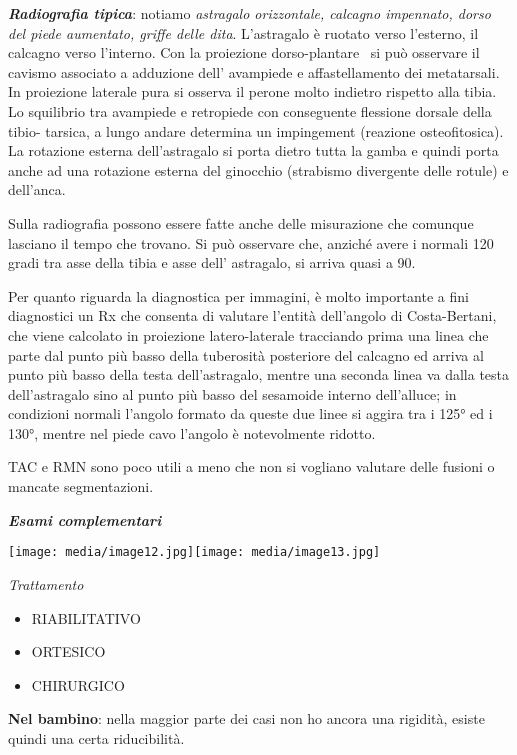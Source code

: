 \documentclass[]{article}
\begin{document}
\emph{\textbf{Radiografia tipica}}: notiamo \emph{astragalo orizzontale,
calcagno impennato, dorso del piede aumentato, griffe delle dita}.
L'astragalo è ruotato verso l'esterno, il calcagno verso l'interno. Con
la proiezione dorso-plantare ~si può osservare il cavismo associato a
adduzione dell' avampiede e affastellamento dei metatarsali. In
proiezione laterale pura si osserva il perone molto indietro rispetto
alla tibia. Lo squilibrio tra avampiede e retropiede con conseguente
flessione dorsale della tibio- tarsica, a lungo andare determina un
impingement (reazione osteofitosica). La rotazione esterna
dell'astragalo si porta dietro tutta la gamba e quindi porta anche ad
una rotazione esterna del ginocchio (strabismo divergente delle rotule)
e dell'anca.

Sulla radiografia possono essere fatte anche delle misurazione che
comunque lasciano il tempo che trovano. Si può osservare che, anziché
avere i normali 120 gradi tra asse della tibia e asse dell' astragalo,
si arriva quasi a 90.

Per quanto riguarda la diagnostica per immagini, è molto importante a
fini diagnostici un Rx che consenta di valutare l'entità dell'angolo di
Costa-Bertani, che viene calcolato in proiezione latero-laterale
tracciando prima una linea che parte dal punto più basso della
tuberosità posteriore del calcagno ed arriva al punto più basso della
testa dell'astragalo, mentre una seconda linea va dalla testa
dell'astragalo sino al punto più basso del sesamoide interno
dell'alluce; in condizioni normali l'angolo formato da queste due linee
si aggira tra i 125° ed i 130°, mentre nel piede cavo l'angolo è
notevolmente ridotto.

TAC e RMN sono poco utili a meno che non si vogliano valutare delle
fusioni o mancate segmentazioni.

\emph{\textbf{Esami complementari}}

\texttt{[image: media/image12.jpg]}\texttt{[image: media/image13.jpg]}

\emph{Trattamento}

\begin{itemize}
\item
  RIABILITATIVO
\item
  ORTESICO~
\item
  CHIRURGICO
\end{itemize}

\textbf{Nel bambino}: nella maggior parte dei casi non ho ancora una
rigidità, esiste quindi una certa riducibilità.
\end{document}
